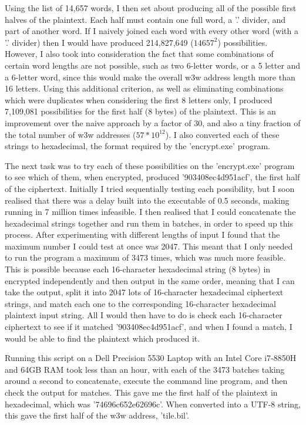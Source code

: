 \documentclass[a4paper, 11pt]{article}
\begin{document}
Using the list of 14,657 words, I then set about producing all of the possible first halves of the plaintext. 
Each half must contain one full word, a '.' divider, and part of another word. 
If I naively joined each word with every other word (with a '.' divider) then I would have produced 214,827,649 ($14657^2$) possibilities. 
However, I also took into consideration the fact that some combinations of certain word lengths are not possible, 
such as two 6-letter words, or a 5 letter and a 6-letter word, since this would make the overall w3w address length more than 16 letters. 
Using this additional criterion, as well as eliminating combinations which were duplicates when considering the first 8 letters only, 
I produced 7,109,081 possibilities for the first half (8 bytes) of the plaintext. 
This is an improvement over the naive approach by a factor of 30, 
and also a tiny fraction of the total number of w3w addresses ($57*10^{12}$). 
I also converted each of these strings to hexadecimal, the format required by the 'encrypt.exe' program. 

The next task was to try each of these possibilities on the 'encrypt.exe' program to see which of them, when encrypted, 
produced '903408ec4d951acf', the first half of the ciphertext. 
Initially I tried sequentially testing each possibility, but I soon realised that there was a delay built into the executable of 0.5 seconds, 
making running in 7 million times infeasible. 
I then realised that I could concatenate the hexadecimal strings together and run them in batches, in order to speed up this process. 
After experimenting with different lengths of input I found that the maximum number I could test at once was 2047. 
This meant that I only needed to run the program a maximum of 3473 times, which was much more feasible. 
This is possible because each 16-character hexadecimal string (8 bytes) in encrypted independently and then output in the same order, 
meaning that I can take the output, split it into 2047 lots of 16-character hexadecimal ciphertext strings, 
and match each one to the corresponding 16-character hexadecimal plaintext input string. 
All I would then have to do is check each 16-character ciphertext to see if it matched '903408ec4d951acf', 
and when I found a match, I would be able to find the plaintext which produced it. 

Running this script on a Dell Precision 5530 Laptop with an Intel Core i7-8850H and 64GB RAM took less than an hour, 
with each of the 3473 batches taking around a second to concatenate, execute the command line program, and then check the output for matches. 
This gave me the first half of the plaintext in hexadecimal, which was '74696c652e62696c'. 
When converted into a UTF-8 string, this gave the first half of the w3w address, 'tile.bil'. 
\end{document}
